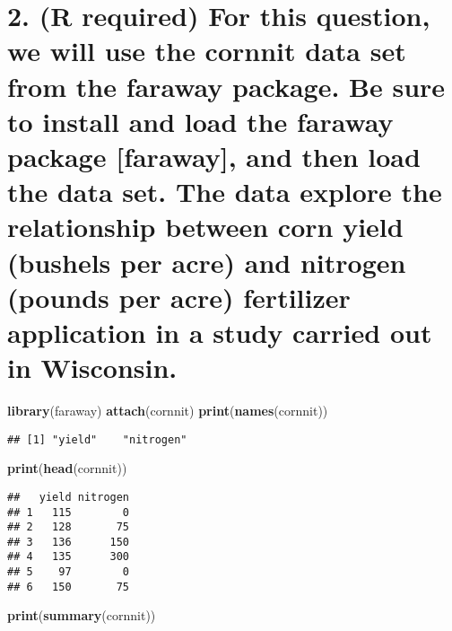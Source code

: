 \documentclass[
]{article}
\newenvironment{Shaded}{\begin{snugshade}}{\end{snugshade}}
\newcommand{\KeywordTok}[1]{\textcolor[rgb]{0.13,0.29,0.53}{\textbf{#1}}}
\newcommand{\NormalTok}[1]{#1}
\begin{document}
\hypertarget{r-required-for-this-question-we-will-use-the-cornnit-data-set-from-the-faraway-package.-be-sure-to-install-and-load-the-faraway-package-faraway-and-then-load-the-data-set.-the-data-explore-the-relationship-between-corn-yield-bushels-per-acre-and-nitrogen-pounds-per-acre-fertilizer-application-in-a-study-carried-out-in-wisconsin.}{%
\section{2. (R required) For this question, we will use the cornnit data
set from the faraway package. Be sure to install and load the faraway
package {[}faraway{]}, and then load the data set. The data explore the
relationship between corn yield (bushels per acre) and nitrogen (pounds
per acre) fertilizer application in a study carried out in
Wisconsin.}\label{r-required-for-this-question-we-will-use-the-cornnit-data-set-from-the-faraway-package.-be-sure-to-install-and-load-the-faraway-package-faraway-and-then-load-the-data-set.-the-data-explore-the-relationship-between-corn-yield-bushels-per-acre-and-nitrogen-pounds-per-acre-fertilizer-application-in-a-study-carried-out-in-wisconsin.}}

\begin{Shaded}
\begin{Highlighting}[]
\KeywordTok{library}\NormalTok{(faraway)}
\KeywordTok{attach}\NormalTok{(cornnit)}
\KeywordTok{print}\NormalTok{(}\KeywordTok{names}\NormalTok{(cornnit))}
\end{Highlighting}
\end{Shaded}

\begin{verbatim}
## [1] "yield"    "nitrogen"
\end{verbatim}

\begin{Shaded}
\begin{Highlighting}[]
\KeywordTok{print}\NormalTok{(}\KeywordTok{head}\NormalTok{(cornnit))}
\end{Highlighting}
\end{Shaded}

\begin{verbatim}
##   yield nitrogen
## 1   115        0
## 2   128       75
## 3   136      150
## 4   135      300
## 5    97        0
## 6   150       75
\end{verbatim}

\begin{Shaded}
\begin{Highlighting}[]
\KeywordTok{print}\NormalTok{(}\KeywordTok{summary}\NormalTok{(cornnit))}
\end{Highlighting}
\end{Shaded}
\end{document}
